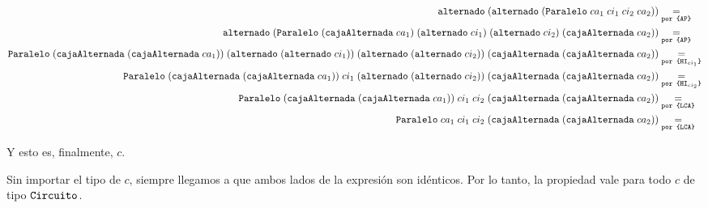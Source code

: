 \begin{scriptsize}
    \begin{equation*}
        \begin{aligned}
            \igualesPor{\alternado \; (\alternado \; (\paralelo{ca_1}{ci_1}{ci_2}{ca_2}))}{}{por \formula{AP}} \\
            \igualesPor{\alternado \; (\paralelo{(\cajaAlternada \; ca_1)}{(\alternado \; ci_1)}{(\alternado \; ci_2)}{(\cajaAlternada \; ca_2)})}{}{por \formula{AP}} \\
            \igualesPor{\paralelo{(\cajaAlternada \; (\cajaAlternada \; ca_1))}{(\alternado \; (\alternado \; ci_1))}{(\alternado \; (\alternado \; ci_2))}{(\cajaAlternada \; (\cajaAlternada \; ca_2))}}{}{por \formula{HI$_{ci_1}$}} \\
            \igualesPor{\paralelo{(\cajaAlternada \; (\cajaAlternada \; ca_1))}{ci_1}{(\alternado \; (\alternado \; ci_2))}{(\cajaAlternada \; (\cajaAlternada \; ca_2))}}{}{por \formula{HI$_{ci_2}$}} \\
            \igualesPor{\paralelo{(\cajaAlternada \; (\cajaAlternada \; ca_1))}{ci_1}{ci_2}{(\cajaAlternada \; (\cajaAlternada \; ca_2))}}{}{por \formula{LCA}} \\
            \igualesPor{\paralelo{ca_1}{ci_1}{ci_2}{(\cajaAlternada \; (\cajaAlternada \; ca_2))}}{}{por \formula{LCA}} \\
        \end{aligned}
    \end{equation*}
\end{scriptsize}

\begin{scriptsize}
\end{scriptsize}

Y esto es, finalmente, $c$.

Sin importar el tipo de $c$, siempre llegamos a que ambos lados de la expresión son idénticos. Por lo tanto, la propiedad vale para todo $c$ de tipo $\circuito$.
